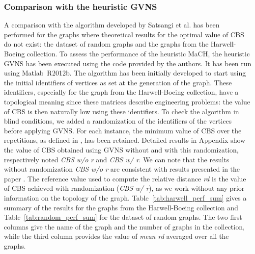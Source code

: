 \documentclass{scrartcl}
\theoremstyle{plain}
\newcommand{\algo}{MaCH}
\newcommand{\gvns}{GVNS}
\newcommand{\cbs}{CBS}
\begin{document}
\subsubsection{Comparison with the heuristic \gvns{}}


A comparison with the algorithm developed by Satsangi et al. \cite{Satsangi2012} 
has been performed for the graphs where theoretical results for the optimal 
value of \cbs{} do not exist: the dataset of random graphs and the graphs from 
the Harwell-Boeing collection. To assess the performance of the heuristic 
\algo{}, the heuristic \gvns{} \cite{Satsangi2012} has been executed using the 
code provided by the authors. It has been run using Matlab~R2012b. The algorithm 
has been initially developed to start using the initial identifiers of vertices 
as set at the generation of the graph. These identifiers, especially for the 
graph from the Harwell-Boeing collection, have a topological meaning since these 
matrices describe engineering problems: the value of \cbs{} is then naturally 
low using these identifiers. To check the algorithm in blind conditions, we 
added a randomization of the identifiers of the vertices before applying 
\gvns{}. For each instance, the minimum value of \cbs{} over the  
repetitions, as defined in \cite{Satsangi2012}, has been retained. Detailed 
results in Appendix show the value of \cbs{} obtained using \gvns{} without and 
with this randomization, respectively noted \emph{\cbs{} w/o r} and \emph{\cbs{} 
w/ r}. We can note that the results without randomization \emph{\cbs{} w/o r} 
are consistent with results presented in the paper \cite{Satsangi2012}. The 
reference value used to compute the relative distance \emph{rd} is the value of 
\cbs{} achieved with randomization (\emph{\cbs{} w/ r}), as we work without any 
prior information on the topology of the graph. Table~\ref{tab:harwell_perf_sum} 
gives a summary of the results for the graphs from the Harwell-Boeing collection 
and Table~\ref{tab:random_perf_sum} for the dataset of random graphs. The two 
first columns give the name of the graph and the number of graphs in the 
collection, while the third column provides the value of \emph{mean rd} averaged 
over all the graphs.
\end{document}
